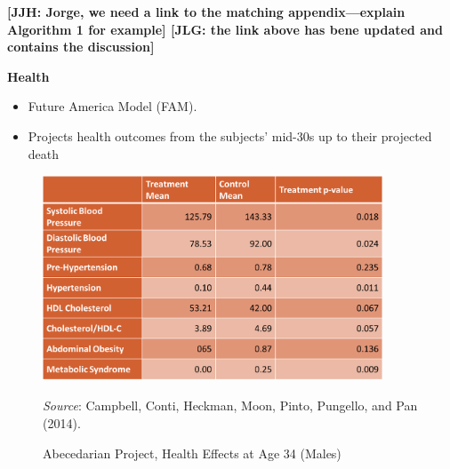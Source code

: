 \documentclass[static]{JJH-Beamer}
\begin{document}
\textbf{[JJH: Jorge, we need a link to the matching appendix---explain Algorithm 1 for example] [JLG: the link above has bene updated and contains the discussion]}

\begin{frame}

\begin{center}
\textbf{Health}
\end{center}

\begin{itemize}
\item Future America Model (FAM).
\item Projects health outcomes from the subjects' mid-30s up to their projected death \citep{Goldman_etal_2015_Future-Elderly-Model-Report}
\end{itemize}

\end{frame}


\begin{frame}

\begin{figure}[H]
\caption{Abecedarian Project, Health Effects at Age 34 (Males)}
\begin{center}
\includegraphics[width=0.9\textwidth]{include/ABC-Health-Effects-Age-35.png}
\end{center}
{\flushleft \scriptsize \emph{Source}: Campbell, Conti, Heckman, Moon, Pinto, Pungello, and Pan (2014).\\}
\end{figure}

\end{frame}
\end{document}
